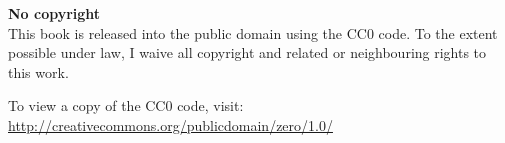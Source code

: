 
\thispagestyle{empty}

\hfill


\medskip

\textbf{No copyright}\\
	\ccLogo \ccZero This book is released into the public domain using the CC0 code. To the extent possible under law, I waive all copyright and related or neighbouring rights to this work.
	
	To view a copy of the CC0 code, visit: \\\url{http://creativecommons.org/publicdomain/zero/1.0/}

\bigskip

\noindent
\textsf{}

\noindent
{}\,